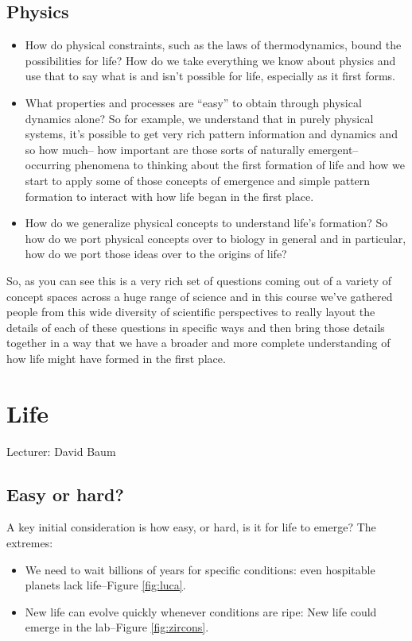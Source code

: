 \documentclass[]{article}
\begin{document}
	
\subsection{Physics}

\begin{itemize}
	\item How do physical constraints, such as the laws of thermodynamics, bound the possibilities for life? How do we take everything we know about
	physics and use that to say what is and
	isn't possible for life, especially as it 
	first forms.
	\item What properties and processes are “easy” to obtain through physical dynamics alone?	So for example, we understand that in
	purely physical systems, it's possible to
	get very rich pattern information and
	dynamics and so how much-- how important
	are those sorts of naturally emergent--
	occurring phenomena to thinking about the
	first formation of life and how we start
	to apply some of those concepts of
	emergence and simple pattern formation to
	interact with
	how life began in the first place.
	\item How do we generalize physical concepts to understand life’s formation? So how do we port physical concepts over
	to biology in general and in particular,
	how do we port those ideas over to the
	origins of life?
\end{itemize}	

So, as you can see this is a very rich
set of questions coming out of a variety
of concept spaces across a huge range of
science and in this course we've gathered
people from this wide diversity of
scientific perspectives to really layout
the details of each of these questions in
specific ways and then bring those details
together in a way that we have a broader
and more complete understanding of how
life might have formed in the first place.



\section{Life}
Lecturer: David Baum
\subsection{Easy or hard?}
A key initial consideration is how easy, or hard, is it for life to emerge?
The extremes:
\begin{itemize}
	\item We need to wait billions of years for specific conditions: even hospitable planets lack life--Figure \ref{fig:luca}.
	\item New life can evolve quickly whenever conditions are ripe:  New life could emerge in the lab--Figure \ref{fig:zircons}.
\end{itemize}
\end{document}
